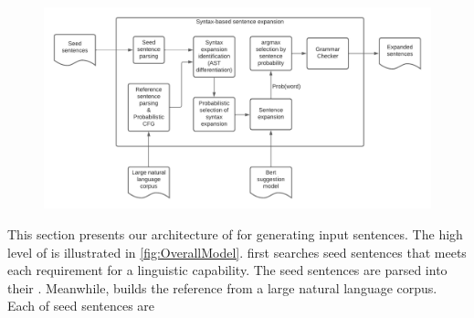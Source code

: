 \section{\Model}
\label{sec:approach}

\begin{figure}
  \centering
  \includegraphics[scale=0.5]{figs/overall.pdf}
  \vspace{-5pt}
  \caption{\OverallModelFigCaption}
  \vspace{-10pt}
\end{figure}

This section presents our architecture of \Model for generating input
sentences. The high level of \Model is illustrated in
\ref{fig:OverallModel}. \Model first searches seed sentences that
meets each requirement for a linguistic capability. The seed sentences
are parsed into their \cfg. Meanwhile, \Model builds the reference
\pcfg from a large natural language corpus. Each \cfg of seed
sentences are 
